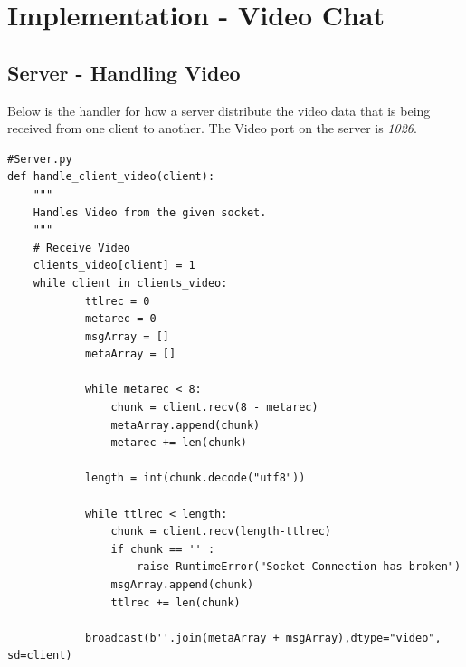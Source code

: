 \documentclass[a4paper,11pt]{article}
\begin{document}
\section{Implementation - Video Chat}

\subsection{Server - Handling Video }
Below is the handler for how a server distribute the video data that is being received from one client to another. The Video port on the server is \textit{1026}. 
\begin{mdframed}[backgroundcolor=light-gray, roundcorner=30pt,leftmargin=1, rightmargin=1, innerleftmargin=5, innertopmargin=-3,innerbottommargin=5, outerlinewidth=1, linecolor=light-gray]
\begin{lstlisting}
#Server.py
def handle_client_video(client):
	"""
	Handles Video from the given socket.
 	"""
	# Receive Video
	clients_video[client] = 1
	while client in clients_video:
            ttlrec = 0
            metarec = 0
            msgArray = []
            metaArray = []

            while metarec < 8:
                chunk = client.recv(8 - metarec)
                metaArray.append(chunk)
                metarec += len(chunk)

            length = int(chunk.decode("utf8"))

            while ttlrec < length:
                chunk = client.recv(length-ttlrec)
                if chunk == '' :
                    raise RuntimeError("Socket Connection has broken")
                msgArray.append(chunk)
                ttlrec += len(chunk)

            broadcast(b''.join(metaArray + msgArray),dtype="video", sd=client)

\end{lstlisting}
\end{mdframed}
\end{document}

